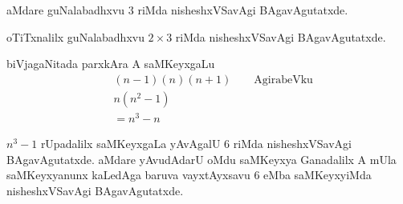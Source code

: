 aMdare guNalabadhxvu $3$ riMda nisheshxVSavAgi BAgavAgutatxde.

oTiTxnalilx guNalabadhxvu $2\times 3$ riMda nisheshxVSavAgi BAgavAgutatxde.

biVjagaNitada parxkAra A saMKeyxgaLu
\begin{align*}
&(n-1)(n)(n+1)\qquad \text{AgirabeVku}\\
&n(n^2-1)\\
&=n^3-n
\end{align*}

$n^3-1$ rUpadalilx saMKeyxgaLa yAvAgalU $6$ riMda nisheshxVSavAgi BAgavAgutatxde. aMdare yAvudAdarU oMdu saMKeyxya Ganadalilx A mUla saMKeyxyanunx kaLedAga baruva vayxtAyxsavu $6$ eMba saMKeyxyiMda nisheshxVSavAgi BAgavAgutatxde.

